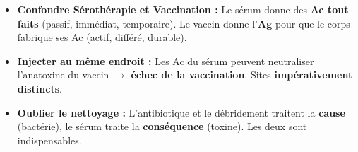 \documentclass[11pt]{article}
\begin{document}
\begin{attention}
\begin{itemize}
    \item \textbf{Confondre Sérothérapie et Vaccination :} Le sérum donne des \textbf{Ac tout faits} (passif, immédiat, temporaire). Le vaccin donne l'\textbf{Ag} pour que le corps fabrique ses Ac (actif, différé, durable).
    \item \textbf{Injecter au même endroit :} Les Ac du sérum peuvent neutraliser l'anatoxine du vaccin $\rightarrow$ \textbf{échec de la vaccination}. Sites \textbf{impérativement distincts}.
    \item \textbf{Oublier le nettoyage :} L'antibiotique et le débridement traitent la \textbf{cause} (bactérie), le sérum traite la \textbf{conséquence} (toxine). Les deux sont indispensables.
\end{itemize}
\end{attention}
\end{document}
